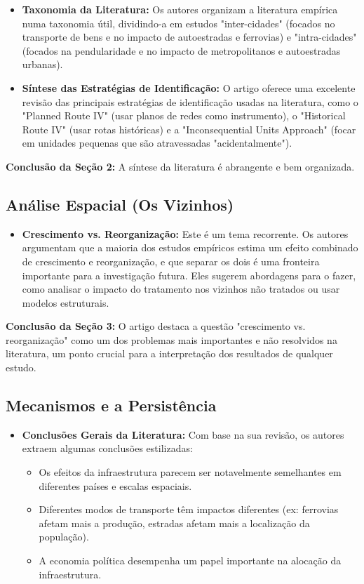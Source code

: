 \documentclass[12pt, a4paper]{article}
\begin{document}
\begin{itemize}
    \item \textbf{Taxonomia da Literatura:} Os autores organizam a literatura empírica numa taxonomia útil, dividindo-a em estudos "inter-cidades" (focados no transporte de bens e no impacto de autoestradas e ferrovias) e "intra-cidades" (focados na pendularidade e no impacto de metropolitanos e autoestradas urbanas).
    \item \textbf{Síntese das Estratégias de Identificação:} O artigo oferece uma excelente revisão das principais estratégias de identificação usadas na literatura, como o "Planned Route IV" (usar planos de redes como instrumento), o "Historical Route IV" (usar rotas históricas) e a "Inconsequential Units Approach" (focar em unidades pequenas que são atravessadas "acidentalmente").
\end{itemize}

\noindent\textbf{Conclusão da Seção 2:} A síntese da literatura é abrangente e bem organizada. 

\subsection{Análise Espacial (Os Vizinhos)}

\begin{itemize}
    \item \textbf{Crescimento vs. Reorganização:} Este é um tema recorrente. Os autores argumentam que a maioria dos estudos empíricos estima um efeito combinado de crescimento e reorganização, e que separar os dois é uma fronteira importante para a investigação futura. Eles sugerem abordagens para o fazer, como analisar o impacto do tratamento nos vizinhos não tratados ou usar modelos estruturais.
\end{itemize}

\noindent\textbf{Conclusão da Seção 3:} O artigo destaca a questão "crescimento vs. reorganização" como um dos problemas mais importantes e não resolvidos na literatura, um ponto crucial para a interpretação dos resultados de qualquer estudo.

\subsection{Mecanismos e a Persistência}

\begin{itemize}
    \item \textbf{Conclusões Gerais da Literatura:} Com base na sua revisão, os autores extraem algumas conclusões estilizadas:
        \begin{itemize}
            \item Os efeitos da infraestrutura parecem ser notavelmente semelhantes em diferentes países e escalas espaciais.
            \item Diferentes modos de transporte têm impactos diferentes (ex: ferrovias afetam mais a produção, estradas afetam mais a localização da população).
            \item A economia política desempenha um papel importante na alocação da infraestrutura.
        \end{itemize}
\end{itemize}
\end{document}
